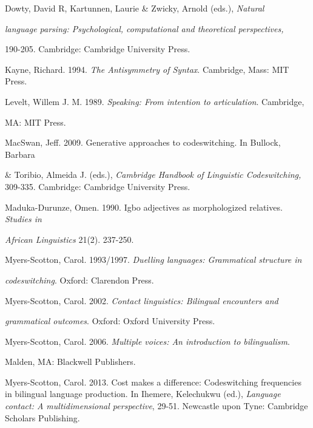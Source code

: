 \documentclass[output=paper]{langsci/langscibook}
\begin{document}
  Dowty, David R, Kartunnen, Laurie \& Zwicky, Arnold (eds.), \textit{Natural }

\textit{  language parsing: Psychological, computational and theoretical perspectives, }

\textit{  }190-205. Cambridge: Cambridge University Press. 


Kayne, Richard. 1994. \textit{The Antisymmetry of Syntax}. Cambridge, Mass: MIT Press.


Levelt, Willem J. M. 1989. \textit{Speaking: From intention to articulation}. Cambridge, 

  MA: MIT Press.{~}


MacSwan, Jeff. 2009. Generative approaches to codeswitching. In Bullock, Barbara 



  \& Toribio, Almeida J. (eds.), \textit{Cambridge Handbook of Linguistic Codeswitching, }309-335. Cambridge: Cambridge University Press.



Maduka-Durunze, Omen. 1990. Igbo adjectives as morphologized relatives. \textit{Studies in }



\textit{  African Linguistics }21(2). 237-250. 



Myers-Scotton, Carol. 1993/1997. \textit{Duelling languages: Grammatical structure in }



\textit{  codeswitching}. Oxford: Clarendon Press. 



Myers-Scotton, Carol. 2002. \textit{Contact linguistics: Bilingual encounters and }



\textit{grammatical outcomes}. Oxford: Oxford University Press. 



Myers-Scotton, Carol. 2006. \textit{Multiple voices: An introduction to bilingualism}.



Malden, MA: Blackwell Publishers.



Myers-Scotton, Carol. 2013. Cost makes a difference: Codeswitching frequencies in bilingual language production. In Ihemere, Kelechukwu (ed.), \textit{Language contact: A multidimensional perspective}, 29-51. Newcastle upon Tyne: Cambridge Scholars Publishing. 
\end{document}
